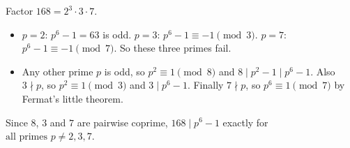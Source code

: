 Factor $168=2^3\cdot3\cdot7$.
\begin{itemize}
\item $p=2$: $p^6-1=63$ is odd. $p=3$: $p^6-1\equiv-1\pmod3$. $p=7$: $p^6-1\equiv-1\pmod7$. So these three primes fail.
\item Any other prime $p$ is odd, so $p^2\equiv1\pmod8$ and $8\mid p^2-1\mid p^6-1$. Also $3\nmid p$, so $p^2\equiv1\pmod3$ and $3\mid p^6-1$. Finally $7\nmid p$, so $p^6\equiv1\pmod7$ by Fermat's little theorem.
\end{itemize}
Since $8$, $3$ and $7$ are pairwise coprime, $168\mid p^6-1$ exactly for $\boxed{\text{all primes }p\ne2,3,7}$.
